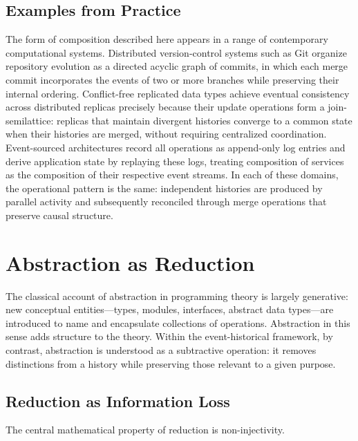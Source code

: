 \documentclass[12pt]{article}
\begin{document}
\subsection{Examples from Practice}

The form of composition described here appears in a range of contemporary computational systems. Distributed version-control systems such as Git organize repository evolution as a directed acyclic graph of commits, in which each merge commit incorporates the events of two or more branches while preserving their internal ordering. Conflict-free replicated data types \cite{shapiro2011} achieve eventual consistency across distributed replicas precisely because their update operations form a join-semilattice: replicas that maintain divergent histories converge to a common state when their histories are merged, without requiring centralized coordination. Event-sourced architectures \cite{fowler2005} record all operations as append-only log entries and derive application state by replaying these logs, treating composition of services as the composition of their respective event streams. In each of these domains, the operational pattern is the same: independent histories are produced by parallel activity and subsequently reconciled through merge operations that preserve causal structure.


\section{Abstraction as Reduction}
\label{sec:abstraction}

The classical account of abstraction in programming theory is largely generative: new conceptual entities---types, modules, interfaces, abstract data types---are introduced to name and encapsulate collections of operations. Abstraction in this sense adds structure to the theory. Within the event-historical framework, by contrast, abstraction is understood as a subtractive operation: it removes distinctions from a history while preserving those relevant to a given purpose.

\subsection{Reduction as Information Loss}

The central mathematical property of reduction is non-injectivity.
\end{document}
